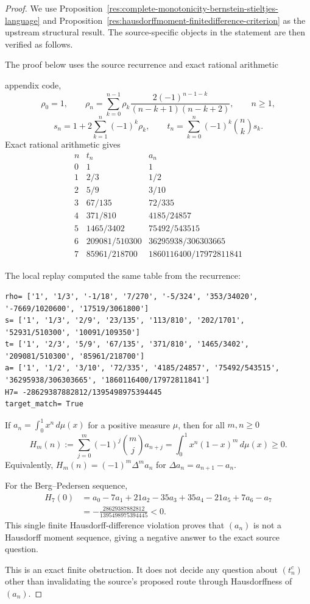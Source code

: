 \documentclass[11pt]{article}
\numberwithin{equation}{section}
\theoremstyle{definition}
\theoremstyle{remark}
\newcommand{\1}{\mathbf 1}
\begin{document}
\begin{proof}
We use Proposition~\ref{res:complete-monotonicity-bernstein-stieltjes-language} and Proposition~\ref{res:hausdorffmoment-finitedifference-criterion} as the upstream structural result. The source-specific objects in the statement are then verified as follows.

The proof below uses the source recurrence and exact rational arithmetic

appendix code,
\[
\rho_0=1,\qquad
\rho_n=\sum_{k=0}^{n-1}\rho_k
\frac{2(-1)^{n-1-k}}{(n-k+1)(n-k+2)},\qquad n\ge1,
\]
\[
s_n=1+2\sum_{k=1}^n(-1)^k\rho_k,\qquad
t_n=\sum_{k=0}^n(-1)^k\binom nk s_k.
\]
Exact rational arithmetic gives
\[
\begin{array}{c|c|c}
n&t_n&a_n\\
\hline
0&1&1\\
1&2/3&1/2\\
2&5/9&3/10\\
3&67/135&72/335\\
4&371/810&4185/24857\\
5&1465/3402&75492/543515\\
6&209081/510300&36295938/306303665\\
7&85961/218700&1860116400/17972811841
\end{array}
\]

The local replay computed the same table from the recurrence:

\begin{verbatim}
rho= ['1', '1/3', '-1/18', '7/270', '-5/324', '353/34020', '-7669/1020600', '17519/3061800']
s= ['1', '1/3', '2/9', '23/135', '113/810', '202/1701', '52931/510300', '10091/109350']
t= ['1', '2/3', '5/9', '67/135', '371/810', '1465/3402', '209081/510300', '85961/218700']
a= ['1', '1/2', '3/10', '72/335', '4185/24857', '75492/543515', '36295938/306303665', '1860116400/17972811841']
H7= -28629387882812/1395498975394445
target_match= True
\end{verbatim}

If \(a_n=\int_0^1 x^n\,d\mu(x)\) for a positive measure \(\mu\), then for
all \(m,n\ge0\)
\[
H_m(n):=\sum_{j=0}^m(-1)^j\binom mj a_{n+j}
=\int_0^1 x^n(1-x)^m\,d\mu(x)\ge0.
\]
Equivalently, \(H_m(n)=(-1)^m\Delta^m a_n\) for
\(\Delta a_n=a_{n+1}-a_n\).

For the Berg--Pedersen sequence,
\[
\begin{aligned}
H_7(0)
&=a_0-7a_1+21a_2-35a_3+35a_4-21a_5+7a_6-a_7\\
&=-\frac{28629387882812}{1395498975394445}<0.
\end{aligned}
\]
This single finite Hausdorff-difference violation proves that \((a_n)\) is
not a Hausdorff moment sequence, giving a negative answer to the exact source
question.

This is an exact finite obstruction. It does not decide any question about
\((t_n^c)\) other than invalidating the source's proposed route through
Hausdorffness of \((a_n)\).
\end{proof}
\end{document}
